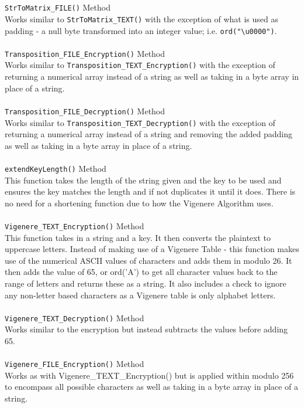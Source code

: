 \documentclass[a4paper, 12pt, titlepage]{report}
\begin{document}
\\\\
\texttt{StrToMatrix\_FILE()} Method\\
Works similar to \texttt{StrToMatrix\_TEXT()} with the exception of what is used as padding - a null byte transformed into an integer value; i.e. \texttt{ord("\textbackslash u0000")}.
\\\\
\texttt{Transposition\_FILE\_Encryption()} Method\\
Works similar to \texttt{Transposition\_TEXT\_Encryption()} with the exception of returning a numerical array instead of a string as well as taking in a byte array in place of a string.
\\\\
\texttt{Transposition\_FILE\_Decryption()} Method\\
Works similar to \texttt{Transposition\_TEXT\_Decryption()} with the exception of returning a numerical array instead of a string and removing the added padding as well as taking in a byte array in place of a string.
\\\\
\texttt{extendKeyLength()} Method\\
This function takes the length of the string given and the key to be used and ensures the key matches the length and if not duplicates it until it does. There is no need for a shortening function due to how the Vigenere Algorithm uses.
\\\\
\texttt{Vigenere\_TEXT\_Encryption()} Method\\
This function takes in a string and a key. It then converts the plaintext to uppercase letters. Instead of making use of a Vigenere Table - this function makes use of the numerical ASCII values of characters and adds them in modulo 26. It then adds the value of 65, or ord('A') to get all character values back to the range of letters and returns these as a string. It also includes a check to ignore any non-letter based characters as a Vigenere table is only alphabet letters.
\\\\
\texttt{Vigenere\_TEXT\_Decryption()} Method\\
Works similar to the encryption but instead subtracts the values before adding 65.
\\\\
\texttt{Vigenere\_FILE\_Encryption()} Method\\
Works as with Vigenere\_TEXT\_Encryption() but is applied within modulo 256 to encompass all possible characters as well as taking in a byte array in place of a string.
\end{document}
